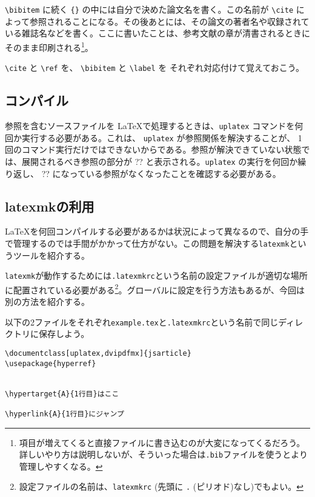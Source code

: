 \verb|\bibitem| に続く \texttt{\{\}} の中には自分で決めた論文名を書く。この名前が \verb|\cite| によって参照されることになる。その後あとには、その論文の著者名や収録されている雑誌名などを書く。ここに書いたことは、参考文献の章が清書されるときにそのまま印刷される\footnote{項目が増えてくると直接ファイルに書き込むのが大変になってくるだろう。詳しいやり方は説明しないが、そういった場合は\texttt{.bib}ファイルを使うとより管理しやすくなる。}。

\verb|\cite| と \verb|\ref| を、 \verb|\bibitem| と \verb|\label| を
それぞれ対応付けて覚えておこう。

\subsection{コンパイル}
\label{sec:latex:compile}

参照を含むソースファイルを \LaTeX で処理するときは、\texttt{uplatex} コマンドを何回か実行する必要がある。これは、 \texttt{uplatex} が参照関係を解決することが、 1 回のコマンド実行だけではできないからである。参照が解決できていない状態では、展開されるべき参照の部分が ?? と表示される。\texttt{uplatex} の実行を何回か繰り返し、 ?? になっている参照がなくなったことを確認する必要がある。

\subsection{latexmkの利用}
\label{sec:latex:latexmk}

\LaTeX を何回コンパイルする必要があるかは状況によって異なるので、自分の手で管理するのでは手間がかかって仕方がない。この問題を解決する\texttt{latexmk}というツールを紹介する。

\texttt{latexmk}が動作するためには\texttt{.latexmkrc}という名前の設定ファイルが適切な場所に配置されている必要がある\footnote{設定ファイルの名前は、\texttt{latexmkrc} (先頭に \texttt{.} (ピリオド)なし)でもよい。}。グローバルに設定を行う方法もあるが、今回は別の方法を紹介する。

以下の2ファイルをそれぞれ\texttt{example.tex}と\texttt{.latexmkrc}という名前で同じディレクトリに保存しよう。

\begin{reidai}
    \begin{verbatim}
\documentclass[uplatex,dvipdfmx]{jsarticle}
\usepackage{hyperref}


\hypertarget{A}{1行目}はここ

\hyperlink{A}{1行目}にジャンプ

\end{verbatim}
\end{reidai}

